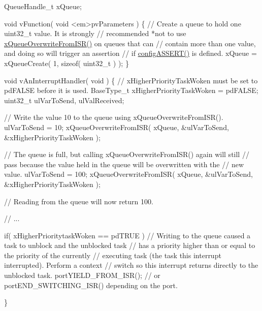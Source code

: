 \begin{DoxyPre} QueueHandle\_t xQueue;\end{DoxyPre}



\begin{DoxyPre} void vFunction( void <em>pvParameters )
 \{
    // Create a queue to hold one uint32\_t value.  It is strongly
    // recommended *not to use \hyperlink{queue_8h_abdcd6a86ef82034d002193e79cfd3ce8}{xQueueOverwriteFromISR()} on queues that can
    // contain more than one value, and doing so will trigger an assertion
    // if \hyperlink{FreeRTOS_8h_a228c70cd48927d6ab730ed1a6dfbe35f}{configASSERT()} is defined.
    xQueue = xQueueCreate( 1, sizeof( uint32\_t ) );
\}\end{DoxyPre}



\begin{DoxyPre}void vAnInterruptHandler( void )
\{
// xHigherPriorityTaskWoken must be set to pdFALSE before it is used.
BaseType\_t xHigherPriorityTaskWoken = pdFALSE;
uint32\_t ulVarToSend, ulValReceived;
\begin{DoxyVerb}// Write the value 10 to the queue using xQueueOverwriteFromISR().
ulVarToSend = 10;
xQueueOverwriteFromISR( xQueue, &ulVarToSend, &xHigherPriorityTaskWoken );

// The queue is full, but calling xQueueOverwriteFromISR() again will still
// pass because the value held in the queue will be overwritten with the
// new value.
ulVarToSend = 100;
xQueueOverwriteFromISR( xQueue, &ulVarToSend, &xHigherPriorityTaskWoken );

// Reading from the queue will now return 100.

// ...

if( xHigherPrioritytaskWoken == pdTRUE )
{
    // Writing to the queue caused a task to unblock and the unblocked task
    // has a priority higher than or equal to the priority of the currently
    // executing task (the task this interrupt interrupted).  Perform a context
    // switch so this interrupt returns directly to the unblocked task.
    portYIELD_FROM_ISR(); // or portEND_SWITCHING_ISR() depending on the port.
}
\end{DoxyVerb}

\}
 \end{DoxyPre}
 